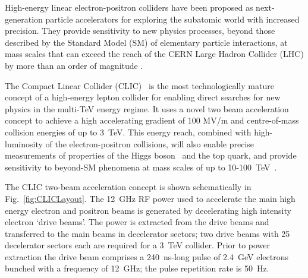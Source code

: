 \documentclass[%
 reprint,
 superscriptaddress,
 amsmath,
 amssymb,
 prl,
]{revtex4-1}
\begin{document}


High-energy linear electron-positron colliders have been proposed as 
next-generation particle accelerators for exploring the subatomic world with 
increased precision. They provide sensitivity to new physics processes, 
beyond those described by the Standard Model (SM) of elementary particle 
interactions, at mass scales that can exceed the reach of the CERN 
Large Hadron Collider (LHC) by more than an order of magnitude 
\cite{CLIC-staging}.

The Compact Linear Collider (CLIC)~\cite{CLICCDR} is the most technologically 
mature concept of a high-energy lepton collider for enabling direct searches 
for new physics in the multi-TeV energy regime. It uses a novel two 
beam acceleration concept to achieve a high accelerating gradient of 100 MV/m 
and centre-of-mass collision energies of up to 3~TeV. This energy reach, 
combined with high-luminosity of the electron-positron collisions, will also 
enable precise measurements of properties of the Higgs boson~\cite{CLIC-Higgs} 
and the top quark, and provide sensitivity to beyond-SM phenomena at mass 
scales of up to 10-100~TeV~\cite{CLIC-staging}.

The CLIC two-beam acceleration concept is shown schematically in 
Fig.~\ref{fig:CLICLayout}. The 12~GHz RF power used to accelerate the main high 
energy electron and positron beams is generated by decelerating high intensity 
electron `drive beams'. The power is extracted from the drive beams and 
transferred to the main beams in decelerator sectors; two drive 
beams with 25 decelerator sectors each are required for a 3~TeV collider. Prior 
to power extraction the drive beam comprises a 240~ns-long pulse of 2.4~GeV 
electrons bunched with a frequency of 12~GHz; the pulse repetition rate is 
50~Hz.
\end{document}
